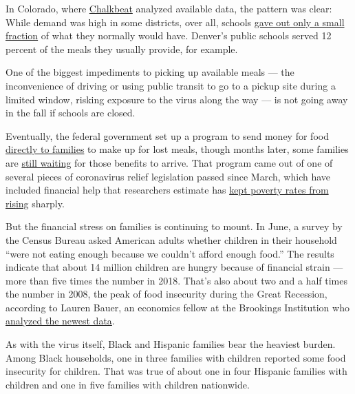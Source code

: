 In Colorado, where
\href{https://www.chalkbeat.org/pages/newsletters}{Chalkbeat} analyzed
available data, the pattern was clear: While demand was high in some
districts, over all, schools
\href{https://co.chalkbeat.org/2020/5/8/21252520/why-colorado-school-districts-are-serving-fewer-meals-during-covid-19-closures}{gave
out only a small fraction} of what they normally would have. Denver's
public schools served 12 percent of the meals they usually provide, for
example.

One of the biggest impediments to picking up available meals --- the
inconvenience of driving or using public transit to go to a pickup site
during a limited window, risking exposure to the virus along the way ---
is not going away in the fall if schools are closed.

Eventually, the federal government set up a program to send money for
food
\href{https://ny.chalkbeat.org/2020/5/20/21265335/nyc-public-school-food-benefits-coronavirus}{directly
to families} to make up for lost meals, though months later, some
families are
\href{https://newark.chalkbeat.org/2020/7/17/21328249/new-jersey-pandemic-ebt-food-benefits-coronavirus}{still
waiting} for those benefits to arrive. That program came out of one of
several pieces of coronavirus relief legislation passed since March,
which have included financial help that researchers estimate has
\href{https://www.nytimes.com/2020/06/21/us/politics/coronavirus-poverty.html}{kept
poverty rates from rising} sharply.

But the financial stress on families is continuing to mount. In June, a
survey by the Census Bureau asked American adults whether children in
their household ``were not eating enough because we couldn't afford
enough food.'' The results indicate that about 14 million children are
hungry because of financial strain --- more than five times the number
in 2018. That's also about two and a half times the number in 2008, the
peak of food insecurity during the Great Recession, according to Lauren
Bauer, an economics fellow at the Brookings Institution who
\href{https://www.brookings.edu/blog/up-front/2020/07/09/about-14-million-children-in-the-us-are-not-getting-enough-to-eat/}{analyzed
the newest data}.

As with the virus itself, Black and Hispanic families bear the heaviest
burden. Among Black households, one in three families with children
reported some food insecurity for children. That was true of about one
in four Hispanic families with children and one in five families with
children nationwide.

